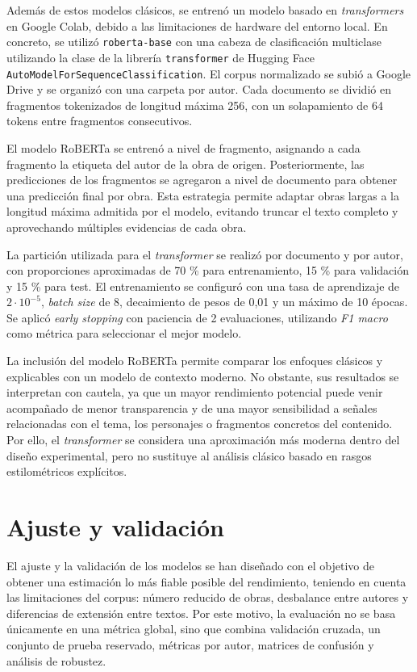 \documentclass[IB]{TFUOC}%
\begin{document}
Además de estos modelos clásicos, se entrenó un modelo basado en \textit{transformers} en Google Colab, debido a las limitaciones de hardware del entorno local. En concreto, se utilizó \texttt{roberta-base} con una cabeza de clasificación multiclase utilizando la clase de la librería \texttt{transformer} de Hugging Face \texttt{AutoModelForSequenceClassification}. El corpus normalizado se subió a Google Drive y se organizó con una carpeta por autor. Cada documento se dividió en fragmentos tokenizados de longitud máxima 256, con un solapamiento de 64 tokens entre fragmentos consecutivos.

El modelo RoBERTa se entrenó a nivel de fragmento, asignando a cada fragmento la etiqueta del autor de la obra de origen. Posteriormente, las predicciones de los fragmentos se agregaron a nivel de documento para obtener una predicción final por obra. Esta estrategia permite adaptar obras largas a la longitud máxima admitida por el modelo, evitando truncar el texto completo y aprovechando múltiples evidencias de cada obra.

La partición utilizada para el \textit{transformer} se realizó por documento y por autor, con proporciones aproximadas de 70 \% para entrenamiento, 15 \% para validación y 15 \% para test. El entrenamiento se configuró con una tasa de aprendizaje de $2 \cdot 10^{-5}$, \textit{batch size} de 8, decaimiento de pesos de 0,01 y un máximo de 10 épocas. Se aplicó \textit{early stopping} con paciencia de 2 evaluaciones, utilizando \textit{F1 macro} como métrica para seleccionar el mejor modelo.

La inclusión del modelo RoBERTa permite comparar los enfoques clásicos y explicables con un modelo de contexto moderno. No obstante, sus resultados se interpretan con cautela, ya que un mayor rendimiento potencial puede venir acompañado de menor transparencia y de una mayor sensibilidad a señales relacionadas con el tema, los personajes o fragmentos concretos del contenido. Por ello, el \textit{transformer} se considera una aproximación más moderna dentro del diseño experimental, pero no sustituye al análisis clásico basado en rasgos estilométricos explícitos.

\section{Ajuste y validación}

El ajuste y la validación de los modelos se han diseñado con el objetivo de obtener una estimación lo más fiable posible del rendimiento, teniendo en cuenta las limitaciones del corpus: número reducido de obras, desbalance entre autores y diferencias de extensión entre textos. Por este motivo, la evaluación no se basa únicamente en una métrica global, sino que combina validación cruzada, un conjunto de prueba reservado, métricas por autor, matrices de confusión y análisis de robustez.
\end{document}
